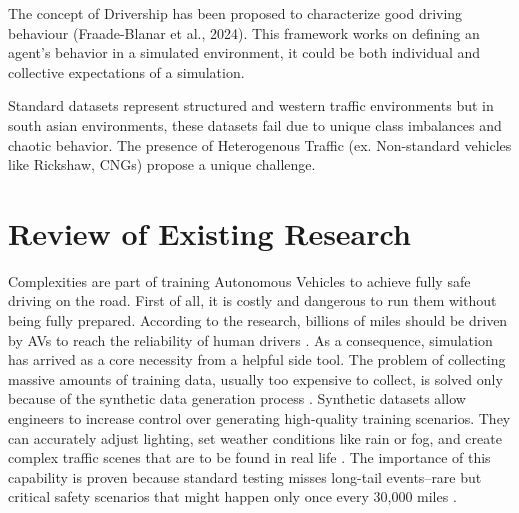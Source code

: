 The concept of Drivership has been proposed to characterize good driving behaviour (Fraade-Blanar et al., 2024). This framework works on defining an agent's behavior in a simulated environment, it could be both individual and collective expectations of a simulation.

Standard datasets represent structured and western traffic environments but in south asian environments, these datasets fail due to unique class imbalances and chaotic behavior. The presence of Heterogenous Traffic (ex. Non-standard vehicles like Rickshaw, CNGs) propose a unique challenge.



\section{Review of Existing Research}


Complexities are part of training Autonomous Vehicles to achieve fully safe driving on the road. First of all, it is costly and dangerous to run them without being fully prepared. According to the research, billions of miles should be driven by AVs to reach the reliability of human drivers \cite{Hu2023Simulation}. As a consequence, simulation has arrived as a core necessity from a helpful side tool. The problem of collecting massive amounts of training data, usually too expensive to collect, is solved only because of the synthetic data generation process \cite{Song2024Synthetic}. Synthetic datasets allow engineers to increase control over generating high-quality training scenarios. They can accurately adjust lighting, set weather conditions like rain or fog, and create complex traffic scenes that are to be found in real life \cite{Song2024Synthetic}. The importance of this capability is proven because standard testing misses long-tail events–rare but critical safety scenarios that might happen only once every 30,000 miles \cite{Hu2023Simulation, Song2024Synthetic}.\\

